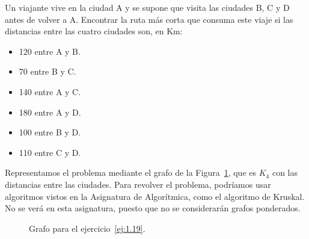 \begin{ejercicio}\label{ej:1.19}
    Un viajante vive en la ciudad A y se supone que visita las ciudades B, C y D antes de volver a A. Encontrar la ruta más corta que consuma este viaje si las distancias entre las cuatro ciudades son, en Km:
    \begin{itemize}
        \item 120 entre A y B.
        \item 70 entre B y C.
        \item 140 entre A y C.
        \item 180 entre A y D.
        \item 100 entre B y D.
        \item 110 entre C y D.
    \end{itemize}

    Representamos el problema mediante el grafo de la Figura~\ref{fig:1.19}, que es $K_4$ con las distancias entre las ciudades.
    Para revolver el problema, podríamos usar algoritmos vistos en la Asignatura de Algorítmica, como el algoritmo de Kruskal. No se verá en esta asignatura, puesto que no se considerarán grafos ponderados.
    \begin{figure}
        \centering
        
        
        \caption{Grafo para el ejercicio~\ref{ej:1.19}.}
        \label{fig:1.19}
    \end{figure}

\end{ejercicio}

